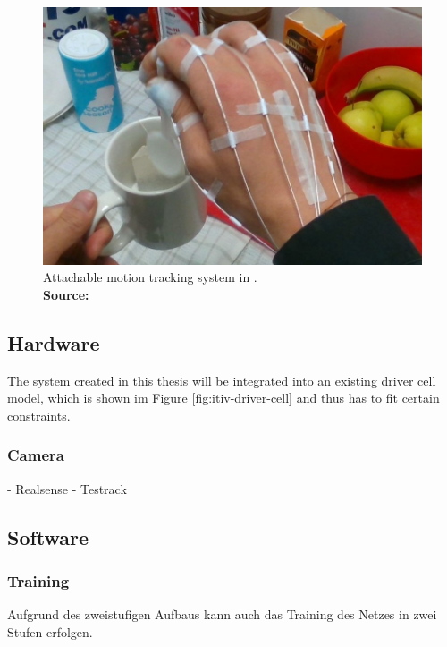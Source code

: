 \begin{figure}
	\centering
	\includegraphics[width=0.7\linewidth]{Ressourcen/garcia-rgb-problem}
	\caption[Attachable motion tracking system]{Attachable motion tracking system in \cite{GarciaHernando2017}. \\ \textbf{Source:} \cite{GarciaHernando2017}}
	\label{fig:garcia-rgb-problem}
\end{figure}

\begin{figure}
	\centering
	
	\caption{}
	\label{fig:software-net-structure-blackbox}
\end{figure}


\subsection{Hardware}
The system created in this thesis will be integrated into an existing driver cell model, which is shown im Figure \ref{fig:itiv-driver-cell} and thus has to fit certain constraints.


\subsubsection{Camera}

- Realsense
- Testrack


\subsection{Software}

	 \subsubsection{Training}
Aufgrund des zweistufigen Aufbaus kann auch das Training des Netzes in zwei Stufen erfolgen.
